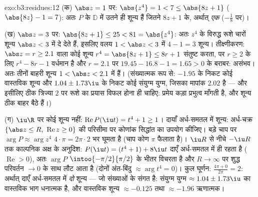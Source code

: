 \begin{solution}{exo:b3:residues:12}
(क) $\abs z = 1$ पर: $\abs{z^4} = 1 < 7 \leq \abs{8z + 1}$ ($\abs{8z} - 1 = 7$): अतः $P$ के $\mathbb D$ में उतने ही शून्य
हैं जितने $8z + 1$ के, अर्थात् \emph{एक} ($-\frac18$ पर)।

(ख) $\abs z = 3$ पर: $\abs{8z + 1} \leq 25 < 81 =
\abs{z^4}$: अतः $z^4$ के विरुद्ध रूशे चारों शून्य $\abs z < 3$ में
दे देते हैं, इसलिए वलय $1 <
\abs z < 3$ में $4 - 1 = 3$ शून्य। तीक्ष्णीकरण: $\abs z = r \geq 2.1$
वाला कोई शून्य $r^4 = \abs{8z + 1} \leq 8r + 1$ संतुष्ट करता, पर $r \geq 2$ के लिए $r^4 -
8r - 1$ वर्धमान है
और $r = 2.1$ पर $19.45 -
16.8 - 1 = 1.65 > 0$ के बराबर: असंभव। अतः तीनों बाहरी शून्य $1 < \abs z < 2.1$ में
हैं। (संख्यात्मक रूप से: $-1.95$ के निकट कोई वास्तविक शून्य और $1.04 \pm
1.73\iu$
के निकट कोई संयुग्म युग्म, जिसका मापांक $2.02$ है --- और इसीलिए ठीक
त्रिज्या $2$ पर रूशे का प्रयास विफल होना ही चाहिए: प्रमेय कड़ा
प्रभुत्व माँगती है, और शून्य ठीक बाहर बैठे हैं।)

(ग) $\iu\R$ पर कोई शून्य नहीं: $\operatorname{Re}P(\iu t) = t^4 +
1 \geq 1$। दायाँ अर्ध-समतल में शून्य:
अर्ध-चक्र $\{\abs z \leq
R,\ \operatorname{Re}z \geq 0\}$ की परिसीमा पर कोणांक सिद्धांत का उपयोग कीजिए। बड़े
चाप पर $\arg P
\approx \arg z^4$ $4\cdot\pi = 2\pi\cdot2$ भर घूमता है (चाप कोण $\pi$ फैलाता है)। $\iu R$ से
नीचे $-\iu R$ तक काल्पनिक अक्ष के अनुदिश: $P(\iu t) = (t^4 + 1) + 8\iu t$ दाएँ अर्ध-समतल में ही
रहता है ($\operatorname{Re} > 0$), अतः $\arg P$ $\intoo{-\pi/2}{\pi/2}$ के भीतर विचरता है और $R \to \infty$ पर शुद्ध
परिवर्तन $\to 0$ के साथ लौट आता है (दोनों अंत-बिंदु $\approx \arg t^4 = 0$)। कुल घूर्णन:
$\frac{4\pi + 0}
{2\pi} = 2$: अर्थात् दाएँ अर्ध-समतल में \emph{दो} शून्य --- जो संख्याओं
के संगत है: संयुग्म युग्म $\approx
1.04 \pm 1.73\iu$ का वास्तविक भाग धनात्मक है, और
वास्तविक शून्य $\approx -0.125$ तथा $\approx -1.96$ ऋणात्मक।
\end{solution}

